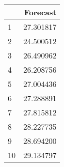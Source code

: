 \begin{tabular}{lr}
\toprule
{} &   Forecast \\
\midrule
1  &  27.301817 \\
2  &  24.500512 \\
3  &  26.490962 \\
4  &  26.208756 \\
5  &  27.004436 \\
6  &  27.288891 \\
7  &  27.815812 \\
8  &  28.227735 \\
9  &  28.694200 \\
10 &  29.134797 \\
\bottomrule
\end{tabular}

